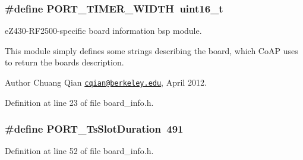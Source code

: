 \subsubsection[{\texorpdfstring{P\+O\+R\+T\+\_\+\+T\+I\+M\+E\+R\+\_\+\+W\+I\+D\+TH}{PORT_TIMER_WIDTH}}]{\setlength{\rightskip}{0pt plus 5cm}\#define P\+O\+R\+T\+\_\+\+T\+I\+M\+E\+R\+\_\+\+W\+I\+D\+TH~{\bf uint16\+\_\+t}}\hypertarget{ez430-rf2500_2board__info_8h_abe66b9c1c60db84f2a99f2b827275f24}{}\label{ez430-rf2500_2board__info_8h_abe66b9c1c60db84f2a99f2b827275f24}


e\+Z430-\/\+R\+F2500-\/specific board information bsp module. 

This module simply defines some strings describing the board, which Co\+AP uses to return the board\textquotesingle{}s description.

\begin{DoxyAuthor}{Author}
Chuang Qian \href{mailto:cqian@berkeley.edu}{\tt cqian@berkeley.\+edu}, April 2012. 
\end{DoxyAuthor}


Definition at line 23 of file board\+\_\+info.\+h.

\subsubsection[{\texorpdfstring{P\+O\+R\+T\+\_\+\+Ts\+Slot\+Duration}{PORT_TsSlotDuration}}]{\setlength{\rightskip}{0pt plus 5cm}\#define P\+O\+R\+T\+\_\+\+Ts\+Slot\+Duration~491}\hypertarget{ez430-rf2500_2board__info_8h_a753468943519d7d3ed61ea7134df2f11}{}\label{ez430-rf2500_2board__info_8h_a753468943519d7d3ed61ea7134df2f11}


Definition at line 52 of file board\+\_\+info.\+h.

